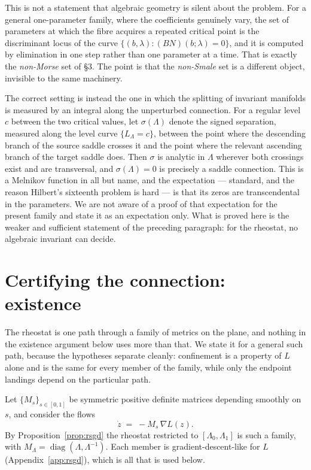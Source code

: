 \documentclass[11pt]{article}
\theoremstyle{plain}
\theoremstyle{definition}
\theoremstyle{remark}
\newcommand{\grad}{\nabla}
\begin{document}
This is not a statement that algebraic geometry is silent about the problem.
For a general one-parameter family, where the coefficients genuinely vary, the
set of parameters at which the fibre acquires a repeated critical point is the
discriminant locus of the curve $\{(b,\lambda) : (BN)(b;\lambda) = 0\}$, and it
is computed by elimination in one step rather than one parameter at a time.
That is exactly the \emph{non-Morse} set of \S3. The point is that the
\emph{non-Smale} set is a different object, invisible to the same machinery.

The correct setting is instead the one in which the splitting of invariant
manifolds is measured by an integral along the unperturbed connection. For a
regular level $c$ between the two critical values, let $\sigma(\Lambda)$ denote
the signed separation, measured along the level curve $\{L_\Lambda = c\}$,
between the point where the descending branch of the source saddle crosses it
and the point where the relevant ascending branch of the target saddle does.
Then $\sigma$ is analytic in $\Lambda$ wherever both crossings exist and are
transversal, and $\sigma(\Lambda) = 0$ is precisely a saddle connection. This
is a Melnikov function in all but name, and the expectation --- standard, and
the reason Hilbert's sixteenth problem is hard --- is that its zeros are
transcendental in the parameters. We are not aware of a proof of that
expectation for the present family and state it as an expectation only. What
is proved here is the weaker and sufficient statement of the preceding
paragraph: for the rheostat, no algebraic invariant can decide.

\section{Certifying the connection: existence}\label{sec:certify}

The rheostat is one path through a family of metrics on the plane, and
nothing in the existence argument below uses more than that. We state it for
a general such path, because the hypotheses separate cleanly: confinement is
a property of $L$ alone and is the same for every member of the family, while
only the endpoint landings depend on the particular path.

Let $\{M_s\}_{s \in [0,1]}$ be symmetric positive definite matrices depending
smoothly on $s$, and consider the flows
\begin{equation}\label{eq:family}
  \dot z \;=\; -M_s\,\grad L(z).
\end{equation}
By Proposition~\ref{prop:rsgd} the rheostat restricted to
$[\Lambda_0, \Lambda_1]$ is such a family, with $M_\Lambda =
\operatorname{diag}(\Lambda, \Lambda^{-1})$. Each member is
gradient-descent-like for $L$ (Appendix~\ref{app:rsgd}), which is all that is
used below.
\end{document}
